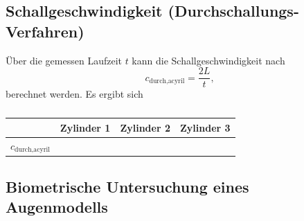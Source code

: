 \subsection{Schallgeschwindigkeit (Durchschallungs-Verfahren)}
Über die gemessen Laufzeit $t$ kann die Schallgeschwindigkeit nach
\begin{equation}
    c_{\text{durch,acyril}}=\frac{2L}{t},
\end{equation}
berechnet werden.
Es ergibt sich
\begin{table}
    \centering
    \begin{tabular}{c| c c c}
        \toprule
        &Zylinder 1&Zylinder 2&Zylinder 3\\
        \midrule
        $c_{\text{durch,acyril}}$&&&\\
        \bottomrule
    \end{tabular}
    \caption{}
\end{table}

\subsection{Biometrische Untersuchung eines Augenmodells}

\label{sec:Auswertung}
